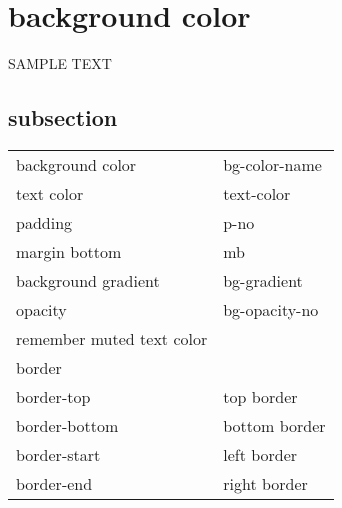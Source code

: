 \documentclass{article}
\begin{document}
	\tableofcontents
	
	\section{background color}
		SAMPLE TEXT
		\subsection{subsection}
		\begin{longtable}{ll}
			\hline
			background color                            & bg-color-name                                                                   \\
			text color                                  & text-color                                                                      \\
			padding                                     & p-no                                                                            \\
			margin bottom                               & mb                                                                              \\
			background gradient                         & bg-gradient                                                                     \\
			opacity                                     & bg-opacity-no                                                                   \\
			remember muted text color                   &                                                                                 \\ \hline
			border                                      &                                                                                 \\ \hline
			border-top                                  & top border                                                                      \\
			border-bottom                               & bottom border                                                                   \\
			border-start                                & left border                                                                     \\
			border-end                                  & right border                                                                    \\

\end{longtable}
\end{document}

